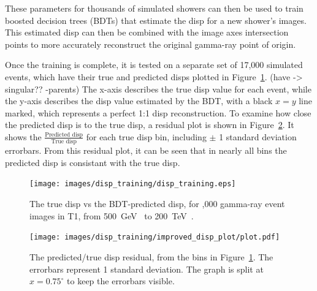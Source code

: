 These parameters for thousands of simulated showers can then be used to train boosted decision trees (BDTs) that estimate the disp for a new shower's images.
This estimated disp can then be combined with the image axes intersection points to more accurately reconstruct the original gamma-ray point of origin.

Once the training is complete, it is tested on a separate set of 17,000 simulated events, which have their true and predicted disps plotted in Figure~\ref{fig:disptraining}.
{\color{red}(have -> singular?? -parents)}
The x-axis describes the true disp value for each event, while the y-axis describes the disp value estimated by the BDT, with a black $x=y$ line marked, which represents a perfect 1:1 disp reconstruction.
To examine how close the predicted disp is to the true disp, a residual plot is shown in Figure~\ref{fig:dispresidual}.
It shows the $\frac{\textrm{Predicted disp}}{\textrm{True disp}}$ for each true disp bin, including $\pm$ 1 standard deviation errorbars.
From this residual plot, it can be seen that in nearly all bins the predicted disp is consistant with the true disp.

\begin{figure}[b]
  \centering
  \texttt{[image: images/disp\_training/disp\_training.eps]}
  \caption[Disp BDT Training]{
    The true disp vs the BDT-predicted disp, for ,000 gamma-ray event images in T1, from \SI{500}{\GeV{}} to \SI{200}{\TeV{}}.
  }
  \label{fig:disptraining}
\end{figure}

\begin{figure}[t]
  \centering
  \texttt{[image: images/disp\_training/improved\_disp\_plot/plot.pdf]}
  \caption[Disp BDT Residual]{
    The predicted/true disp residual, from the bins in Figure~\ref{fig:disptraining}.
    The errorbars represent 1 standard deviation.
    The graph is split at $x=0.75^{\circ}$ to keep the errorbars visible.
  }
  \label{fig:dispresidual}
\end{figure}

